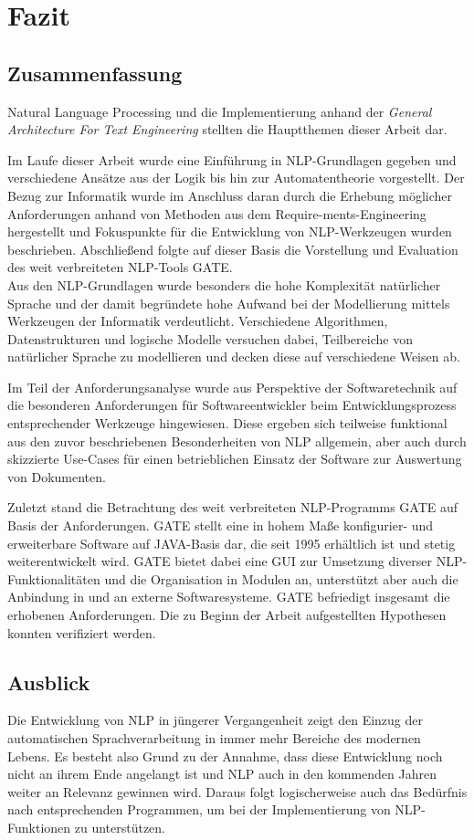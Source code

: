 \documentclass[12pt]{report}
\begin{document}
\chapter{Fazit}
\section{Zusammenfassung}
Natural Language Processing und die Implementierung anhand der \textit{General Architecture For Text Engineering} stellten die Hauptthemen dieser Arbeit dar.

Im Laufe dieser Arbeit wurde eine Einführung in NLP-Grundlagen gegeben und verschiedene Ansätze aus der Logik bis hin zur Automatentheorie vorgestellt. Der Bezug zur Informatik wurde im Anschluss daran durch die Erhebung möglicher Anforderungen anhand von Methoden aus dem Require-ments-Engineering hergestellt und Fokuspunkte für die Entwicklung von NLP-Werkzeugen wurden beschrieben. Abschließend folgte auf dieser Basis die Vorstellung und Evaluation des weit verbreiteten NLP-Tools GATE. \\

Aus den NLP-Grundlagen wurde besonders die hohe Komplexität natürlicher Sprache und der damit begründete hohe Aufwand bei der Modellierung mittels Werkzeugen der Informatik verdeutlicht. Verschiedene Algorithmen, Datenstrukturen und logische Modelle versuchen dabei, Teilbereiche von natürlicher Sprache zu modellieren und decken diese auf verschiedene Weisen ab.

Im Teil der Anforderungsanalyse wurde aus Perspektive der Softwaretechnik auf die besonderen Anforderungen für Softwareentwickler beim Entwicklungsprozess entsprechender Werkzeuge hingewiesen. Diese ergeben sich teilweise funktional aus den zuvor beschriebenen Besonderheiten von NLP allgemein, aber auch durch skizzierte Use-Cases für einen betrieblichen Einsatz der Software zur Auswertung von Dokumenten.

Zuletzt stand die Betrachtung des weit verbreiteten NLP-Programms GATE auf Basis der Anforderungen. GATE stellt eine in hohem Maße konfigurier- und erweiterbare Software auf JAVA-Basis dar, die seit 1995 erhältlich ist und stetig weiterentwickelt wird. GATE bietet dabei eine GUI zur Umsetzung diverser NLP-Funktionalitäten und die Organisation in Modulen an, unterstützt aber auch die Anbindung in und an externe Softwaresysteme. GATE befriedigt insgesamt die erhobenen Anforderungen. Die zu Beginn der Arbeit aufgestellten Hypothesen konnten verifiziert werden.

\section{Ausblick}
Die Entwicklung von NLP in jüngerer Vergangenheit zeigt den Einzug der automatischen Sprachverarbeitung in immer mehr Bereiche des modernen Lebens. Es besteht also Grund zu der Annahme, dass diese Entwicklung noch nicht an ihrem Ende angelangt ist und NLP auch in den kommenden Jahren weiter an Relevanz gewinnen wird. Daraus folgt logischerweise auch das Bedürfnis nach entsprechenden Programmen, um bei der Implementierung von NLP-Funktionen zu unterstützen.\\
\end{document}
